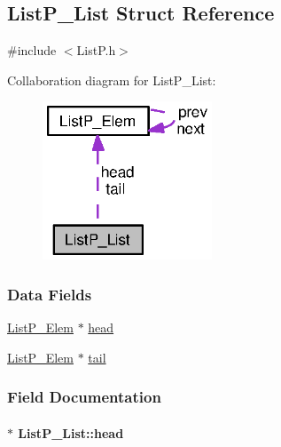 \subsection{List\+P\+\_\+\+List Struct Reference}
\label{struct_list_p___list}


{\ttfamily \#include $<$List\+P.\+h$>$}



Collaboration diagram for List\+P\+\_\+\+List\+:
\nopagebreak
\begin{figure}[H]
\begin{center}
\leavevmode
\includegraphics[width=143pt]{struct_list_p___list__coll__graph}
\end{center}
\end{figure}
\subsubsection*{Data Fields}
\begin{DoxyCompactItemize}
\item 
\hyperlink{struct_list_p___elem}{List\+P\+\_\+\+Elem} $\ast$ \hyperlink{struct_list_p___list_a937b10e3df18e2f71a416b40b0241dd2}{head}
\item 
\hyperlink{struct_list_p___elem}{List\+P\+\_\+\+Elem} $\ast$ \hyperlink{struct_list_p___list_a917e6cc15b641c716a5919386f47183b}{tail}
\end{DoxyCompactItemize}


\subsubsection{Field Documentation}
\paragraph[{head}]{$\ast$ List\+P\+\_\+\+List\+::head}\label{struct_list_p___list_a937b10e3df18e2f71a416b40b0241dd2}
